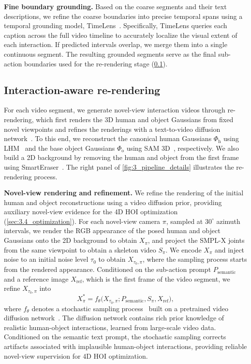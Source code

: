 \noindent\textbf{Fine boundary grounding.}
Based on the coarse segments and their text descriptions, we refine the coarse boundaries into precise temporal spans using a temporal grounding model, TimeLens~\cite{zhang2026timelens}.
Specifically, TimeLens queries each caption across the full video timeline to accurately localize the visual extent of each interaction.
If predicted intervals overlap, we merge them into a single continuous segment.
The resulting grounded segments serve as the final sub-action boundaries used for the re-rendering stage (\cref{sec:3.3_generation}).


\subsection{Interaction-aware re-rendering}
\label{sec:3.3_generation}
For each video segment, we generate novel-view interaction videos through re-rendering, which first renders the 3D human and object Gaussians from fixed novel viewpoints and refines the renderings with a text-to-video diffusion network~\cite{wan2025wan}.
To this end, we reconstruct the canonical human Gaussians $\Phi_{\text{h}}$ using LHM~\cite{qiu2025lhm} and the base object Gaussians $\Phi_{\text{o}}$ using SAM 3D~\cite{chen2026sam}, respectively.
We also build a 2D background by removing the human and object from the first frame using SmartEraser~\cite{jiang2025smarteraser}.
The right panel of \cref{fig:3_pipeline_details} illustrates the re-rendering process.


\noindent\textbf{Novel-view rendering and refinement.}
We refine the rendering of the initial human and object reconstructions using a video diffusion prior, providing auxiliary novel-view evidence for the 4D HOI optimization (\cref{sec:3.4_optimization}).
For each novel-view camera $\pi$, sampled at $30^\circ$ azimuth intervals, we render the RGB appearance of the posed human and object Gaussians onto the 2D background to obtain $X_{\pi}$, and project the SMPL-X joints from the same viewpoint to obtain a skeleton video $S_{\pi}$.
We encode $X_{\pi}$ and inject noise to an initial noise level $\tau_0$ to obtain $X_{\tau_0,\pi}$, where the sampling process starts from the rendered appearance.
Conditioned on the sub-action prompt $P_{\text{semantic}}$ and a reference image $X_{\text{ref}}$, which is the first frame of the video segment, we refine $X_{\tau_0,\pi}$ into
\begin{equation}
X^{*}_{\pi} = f_\theta\big(X_{\tau_0,\pi}; P_{\text{semantic}}, S_{\pi}, X_{\text{ref}}\big),
\label{eq:refine}
\end{equation}
where $f_\theta$ denotes a stochastic sampling process~\cite{lipman2023flow} built on a pretrained video diffusion network~\cite{wan2025wan}.
The diffusion network contains rich prior knowledge of realistic human-object interactions, learned from large-scale video data.
Conditioned on the semantic text prompt, the stochastic sampling corrects artifacts associated with implausible human-object interactions, providing reliable novel-view supervision for 4D HOI optimization.


